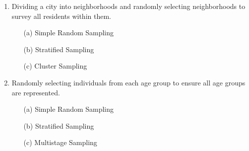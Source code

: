 \documentclass{article}
\begin{document}
\begin{enumerate}
    \item Dividing a city into neighborhoods and randomly selecting neighborhoods to survey all residents within them.
    \begin{itemize}
        \item[(a)] Simple Random Sampling
        \item[(b)] Stratified Sampling
        \item[(c)] Cluster Sampling
    \end{itemize}
    
    \item Randomly selecting individuals from each age group to ensure all age groups are represented.
    \begin{itemize}
        \item[(a)] Simple Random Sampling
        \item[(b)] Stratified Sampling
        \item[(c)] Multistage Sampling
    \end{itemize}
\end{enumerate}
\end{document}
